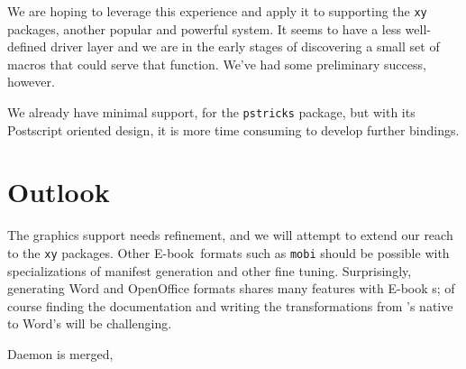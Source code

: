 \documentclass{llncs}
\def\ebook{\mbox{E-book}\xspace}
\begin{document}
We are hoping to leverage this experience and apply
it to supporting the \texttt{xy} packages, another
popular and powerful system.  It seems to have a less
well-defined driver layer and we are in the early stages of
discovering a small set of macros that could serve that
function.  We've had some preliminary success, however.

We already have minimal support, for the \texttt{pstricks}
package, but with its Postscript oriented design,
it is more time consuming to develop further bindings.

\section{Outlook}
The graphics support needs refinement, and we will attempt
to extend our reach to the \texttt{xy} packages.
Other \ebook\ formats such as \texttt{mobi} should be possible with
specializations of manifest generation and other fine tuning.
Surprisingly, generating Word and OpenOffice formats shares many features
with \ebook s; of course finding the documentation and writing the \XSLT
transformations from \LaTeXML's native \XML to Word's will be challenging.


Daemon is merged, 



\end{document}
